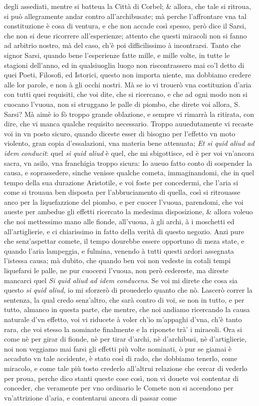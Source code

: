 \documentclass[11pt,twoside,openany]{book}
\begin{document}
degli assediati, mentre si batteua la Città di Corbel; \& allora, che tale si ritroua, si può allegramente andar contro all'archibusate; mà perche l'affrontare vna tal constituzione è cosa di ventura, e che non accade così spesso, però dice il Sarsi, che non si deue ricorrere all'esperienze; attento che questi miracoli non si fanno ad arbitrio nostro, mà del caso, ch'è poi difficilissimo à incontrarsi. Tanto che signor Sarsi, quando bene l'esperienze fatte mille, e mille volte, in tutte le stagioni dell'anno, ed in qualsiuoglia luogo non riscontrassero mai co'l detto di quei Poeti, Filosofi, ed Istorici, questo non importa niente, ma dobbiamo credere alle lor parole, e non à gli occhi nostri. Mà se io vi trouerò vna costituzion d'aria con tutti quei requisiti, che voi dite, che si ricercano, e che ad ogni modo non si cuocano l'vuoua, non si struggano le palle di piombo, che direte voi allora, S. Sarsi? Mà aimè io fò troppo grande oblazione, e sempre vi rimarrà la ritirata, con dire, che vi manca qualche requisito necessario. Troppo auuedutamente vi recaste voi in vn posto sicuro, quando diceste esser di bisogno per l'effetto vn moto violento, gran copia d'essalazioni, vna materia bene attenuata; \textit{Et si quid aliud ad idem conducit}: quel \textit{si quid aliud} è quel, che mi sbigottisce, ed è per voi vn'ancora sacra, vn asilo, vna franchigia troppo sicura: Io aueuo fatto conto di sospender la causa, e soprassedere, sinche venisse qualche cometa, immaginandomi, che in quel tempo della sua durazione Aristotile, e voi foste per concedermi, che l'aria si come si trouaua ben disposta per l'abbruciamento di quella, così si ritrouasse anco per la liquefazzione del piombo, e per cuocer l'vuoua, parendomi, che voi aueste per ambedue gli effetti ricercato la medesima disposizione, \& allora voleuo che noi mettessimo mano alle fionde, all'vuoua, à gli archi, à i moschetti ed all'artiglierie, e ci chiarissimo in fatto della verità di questo negozio. Anzi pure che senz'aspettar comete, il tempo dourebbe essere opportuno di meza state, e quando l'aria lampeggia, e fulmina, venendo à tutti questi ardori assegnata l'istessa causa; mà dubito, che quando ben voi non vedeste in cotali tempi liquefarsi le palle, ne pur cuocersi l'vuoua, non però cedereste, ma direste mancarci quel \textit{Si quid aliud ad idem conducens}. Se voi mi direte che cosa sia questo \textit{si quid aliud}, io mi sforzerò di prouederlo quanto che nò. Lascerò correr la sentenza, la qual credo senz'altro, che sarà contro di voi, se non in tutto, e per tutto, almanco in questa parte, che mentre, che noi andiamo ricercando la causa naturale d'vn effetto, voi vi riducete à voler ch'io m'appaghi d'vna, ch'è tanto rara, che voi stesso la nominate finalmente e la riponete trà' i miracoli. Ora si come nè per girar di fionde, nè per tirar d'archi, nè d'archibusi, nè d'artiglierie, noi non veggiamo mai farsi gli effetti più volte nominati, ò pur se giamai è accaduto vn tale accidente, è stato così di rado, che dobbiamo tenerlo, come miracolo, e come tale più tosto crederlo all'altrui relazione che cercar di vederlo per proua, perche dico stanti queste cose così, non vi douete voi contentar di conceder, che veramente per vno ordinario le Comete non si accendono per vn'attrizione d'aria, e contentarui ancora di passar come 
\end{document}
